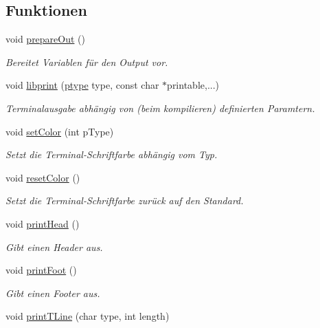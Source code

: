 \subsection*{Funktionen}
\begin{DoxyCompactItemize}
\item 
void \hyperlink{group___lend_lib_out_gae6bfc3bcebb80e387b4ad8a773496437}{prepare\+Out} ()
\begin{DoxyCompactList}\small\item\em Bereitet Variablen für den Output vor. \end{DoxyCompactList}\item 
void \hyperlink{group___lend_lib_out_ga152ba05f7c1a27f69bd9c243359609c6}{libprint} (\hyperlink{group___lend_lib_out_ga0916607956575302a93dbd21440edc1a}{ptype} type, const char $\ast$printable,...)
\begin{DoxyCompactList}\small\item\em Terminalausgabe abhängig von (beim kompilieren) definierten Paramtern. \end{DoxyCompactList}\item 
void \hyperlink{group___lend_lib_out_ga1b5f37b5e6ac0f38b6933a16e0460579}{set\+Color} (int p\+Type)
\begin{DoxyCompactList}\small\item\em Setzt die Terminal-\/\+Schriftfarbe abhängig vom Typ. \end{DoxyCompactList}\item 
void \hyperlink{group___lend_lib_out_gafe00396766eb6b8ca4674de4c5d3d949}{reset\+Color} ()
\begin{DoxyCompactList}\small\item\em Setzt die Terminal-\/\+Schriftfarbe zurück auf den Standard. \end{DoxyCompactList}\item 
void \hyperlink{group___lend_lib_out_ga903241157072885e802dea85fc6a976c}{print\+Head} ()
\begin{DoxyCompactList}\small\item\em Gibt einen Header aus. \end{DoxyCompactList}\item 
void \hyperlink{group___lend_lib_out_gaa5964f653524972b1bca64e6e8a7622d}{print\+Foot} ()
\begin{DoxyCompactList}\small\item\em Gibt einen Footer aus. \end{DoxyCompactList}\item 
void \hyperlink{group___lend_lib_out_ga5a511942adfe4ce80256d665208eb204}{print\+T\+Line} (char type, int length)

\end{DoxyCompactItemize}
